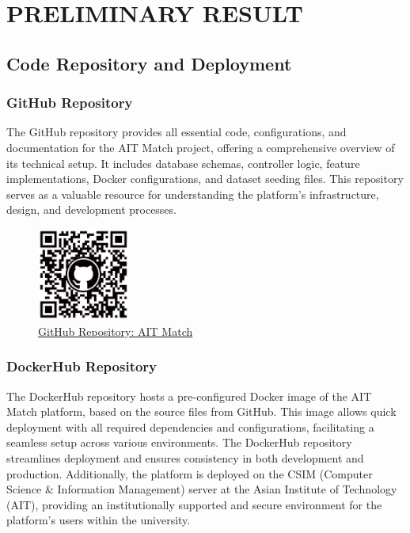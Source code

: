 \setlength{\footskip}{8mm}

\chapter{PRELIMINARY RESULT}
    \section{Code Repository and Deployment}
        \subsection{GitHub Repository} 
        The GitHub repository provides all essential code, configurations, and documentation for the AIT Match project, offering a comprehensive overview of its technical setup. It includes database schemas, controller logic, feature implementations, Docker configurations, and dataset seeding files. This repository serves as a valuable resource for understanding the platform's infrastructure, design, and development processes.
        
        \begin{figure}[h]
        \centering
        \includegraphics[width=1.2in]{figures/qr-code-github.png} 
        \captionsetup{justification=centering, singlelinecheck=false, labelsep=space}
        \caption{\href{https://github.com/werrnnnwerrrnnnnnn/AIT-Match}{GitHub Repository: AIT Match}}
        \label{fig:github_qr}
        \end{figure}

        \subsection{DockerHub Repository}
        The DockerHub repository hosts a pre-configured Docker image of the AIT Match platform, based on the source files from GitHub. This image allows quick deployment with all required dependencies and configurations, facilitating a seamless setup across various environments. The DockerHub repository streamlines deployment and ensures consistency in both development and production. Additionally, the platform is deployed on the CSIM (Computer Science \& Information Management) server at the Asian Institute of Technology (AIT), providing an institutionally supported and secure environment for the platform’s users within the university.

